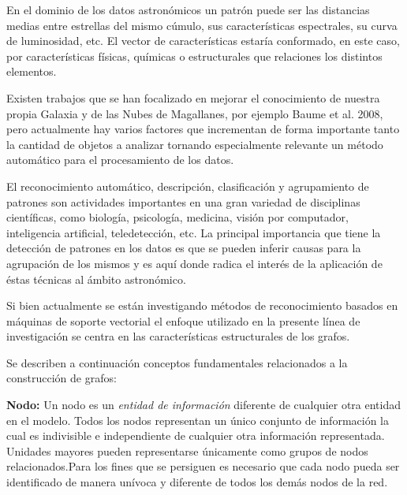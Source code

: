 	En el dominio de los datos astronómicos un patrón puede ser las distancias medias entre estrellas del mismo cúmulo, sus características espectrales, su curva de luminosidad, etc. El vector de características estaría conformado, en este caso, por características físicas, químicas o estructurales que relaciones los distintos elementos.
	
	Existen trabajos que se han focalizado en mejorar el conocimiento de nuestra propia Galaxia y de las Nubes de Magallanes, por ejemplo Baume et al. 2008\cite{baume2008basic}, pero actualmente hay varios factores que incrementan de forma importante tanto la cantidad de objetos a analizar tornando especialmente relevante un método automático para el procesamiento de los datos.
	
	El reconocimiento automático, descripción, clasificación y agrupamiento de patrones son actividades importantes en una gran variedad de disciplinas científicas, como biología, psicología, medicina, visión por computador, inteligencia artificial, teledetección, etc. La principal importancia que tiene la detección de patrones en los datos es que se pueden inferir causas para la agrupación de los mismos y es aquí donde radica el interés de la aplicación de éstas técnicas al ámbito astronómico.
	
	
	Si bien actualmente se están investigando métodos de reconocimiento basados en máquinas de soporte vectorial\cite{burges1998tutorial} el enfoque utilizado en la presente línea de investigación se centra en las características estructurales de los grafos\cite{bunke1983inexact,pavlidis2013}.
	
	Se describen a continuación conceptos fundamentales relacionados a la construcción de grafos:
	
	\textbf{Nodo:} Un nodo es un \emph{entidad de información} diferente de cualquier otra entidad en el modelo. Todos los nodos representan un único conjunto de información la cual es indivisible e independiente de cualquier otra información representada. Unidades mayores pueden representarse únicamente como grupos de nodos relacionados.Para los fines que se persiguen es necesario que cada nodo pueda ser identificado de manera unívoca y diferente de todos los demás nodos de la red.
	
